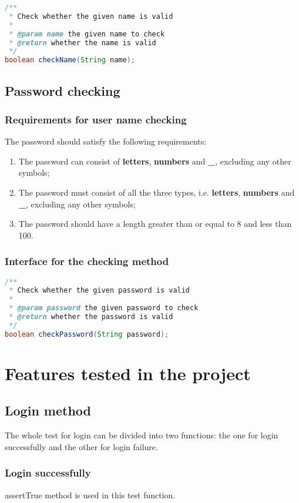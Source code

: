 \documentclass[a4paper]{report}
\begin{document}
\begin{lstlisting}[language=java]
/**
 * Check whether the given name is valid
 *
 * @param name the given name to check
 * @return whether the name is valid
 */
boolean checkName(String name);
\end{lstlisting}
\section{Password checking}
\subsection{Requirements for user name checking}
The password should satisfy the following requirements:
\begin{enumerate}
\item The password can consist of \textbf{letters}, \textbf{numbers} and \textbf{\_}, excluding any other symbols;
\item The password must consist of all the three types, i.e. \textbf{letters}, \textbf{numbers} and \textbf{\_}, excluding any other symbols;
\item The password should have a length greater than or equal to 8 and less than 100.
\end{enumerate}
\subsection{Interface for the checking method}
\begin{lstlisting}[language=java]
/**
 * Check whether the given password is valid
 *
 * @param password the given password to check
 * @return whether the password is valid
 */
boolean checkPassword(String password);
\end{lstlisting}
\chapter{Features tested in the project}
\section{Login method}
\par The whole test for login can be divided into two functions: the one for login successfully and the other for login failure.
\subsection{Login successfully}
\par assertTrue method is used in this test function.
\end{document}
